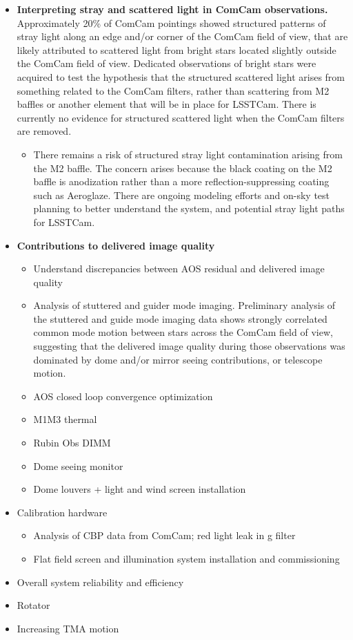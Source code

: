 \begin{itemize}
    \item \textbf{Interpreting stray and scattered light in ComCam observations.} Approximately 20\% of ComCam pointings showed structured patterns of stray light along an edge and/or corner of the ComCam field of view, that are likely attributed to scattered light from bright stars located slightly outside the ComCam field of view.
    Dedicated observations of bright stars were acquired to test the hypothesis that the structured scattered light arises from something related to the ComCam filters, rather than scattering from M2 baffles or another element that will be in place for LSSTCam.
    There is currently no evidence for structured scattered light when the ComCam filters are removed.
    \begin{itemize}
        \item There remains a risk of structured stray light contamination arising from the M2 baffle.
        The concern arises because the black coating on the M2 baffle is anodization rather than a more reflection-suppressing coating such as Aeroglaze.
        There are ongoing modeling efforts and on-sky test planning to better understand the system, and potential stray light paths for LSSTCam.
    \end{itemize}
    \item \textbf{Contributions to delivered image quality}
    \begin{itemize}
        \item Understand discrepancies between AOS residual and delivered image quality
        \item Analysis of stuttered and guider mode imaging. Preliminary analysis of the stuttered and guide mode imaging data shows strongly correlated common mode motion between stars across the ComCam field of view, suggesting that the delivered image quality during those observations was dominated by dome and/or mirror seeing contributions, or telescope motion.
        \item AOS closed loop convergence optimization
        \item M1M3 thermal
        \item Rubin Obs DIMM
        \item Dome seeing monitor
        \item Dome louvers + light and wind screen installation
    \end{itemize}
    \item Calibration hardware
    \begin{itemize}
        \item Analysis of CBP data from ComCam; red light leak in g filter
        \item Flat field screen and illumination system installation and commissioning
    \end{itemize}
    \item Overall system reliability and efficiency
    \item Rotator
    \item Increasing TMA motion
\end{itemize}